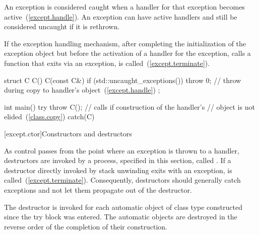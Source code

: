\pnum
{}%
%
%
An exception is considered caught when a handler for that exception
becomes active~(\ref{except.handle}).
\enternote
An exception can have active handlers and still be considered uncaught if
it is rethrown.
\exitnote

\pnum
{}%
%
If the exception handling mechanism, after completing the initialization of the
exception object but before the activation of a handler for the exception,
calls a function that exits via an
exception,  is called~(\ref{except.terminate}). \enterexample

\begin{codeblock}
struct C {
  C() { }
  C(const C&) {
    if (std::uncaught_exceptions()) {
      throw 0;      // throw during copy to handler's  object~(\ref{except.handle})
    }
  }
};

int main() {
  try {
    throw C();      // calls  if construction of the handler's
                    //  object is not elided~(\ref{class.copy})
  } catch(C) { }
}
\end{codeblock}

\exitexample


[except.ctor]{Constructors and destructors}%
%
%
%

\pnum
{}%
As control passes from the point where an exception is thrown
to a handler,
destructors are invoked by a process, specified in this section, called
. If a destructor directly invoked by stack unwinding
exits with an exception,  is called~(\ref{except.terminate}).
\enternote
Consequently, destructors should generally catch exceptions and not let them
propagate out of the destructor.
\exitnote

\pnum
The destructor is invoked for each automatic object of class type constructed
since the try block was entered.
The automatic objects are destroyed in the reverse order of the completion
of their construction.

